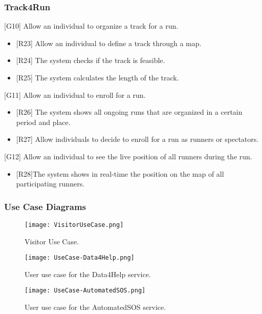 \documentclass[12pt]{article}
\begin{document}
\subsubsection{Track4Run}
[G10] Allow an individual to organize a track for a run.\newline
\begin{itemize}
    \item {[R23]} Allow an individual to define a track through a map. 
    \item {[R24]} The system checks if the track is feasible.
    \item {[R25]} The system calculates the length of the track. 
\end{itemize}
[G11] Allow an individual to enroll for a run.\newline 
\begin{itemize}
    \item {[R26]} The system shows all ongoing runs that are organized in a certain period and place. 
    \item {[R27]} Allow individuals to decide to enroll for a run as runners or spectators.
\end{itemize}
[G12] Allow an individual to see the live position of all runners during the run.\newline 
\begin{itemize}
    \item {[R28]}The system shows in real-time the position on the map of all participating runners.
\end{itemize}
\subsubsection{Use Case Diagrams}

\begin{figure}[H]
\texttt{[image: VisitorUseCase.png]}
\centering
\label{fig:VisitorUseCase}
\caption{Visitor Use Case.}
\end{figure}

\begin{figure}[H]
\texttt{[image: UseCase-Data4Help.png]}
\centering
\label{fig:UseCase-Data4Help}
\caption{User use case for the Data4Help service.}
\end{figure}

\begin{figure}[H]
\texttt{[image: UseCase-AutomatedSOS.png]}
\centering
\label{fig:UseCase-AutomatedSOS}
\caption{User use case for the AutomatedSOS service.}
\end{figure}
\end{document}
